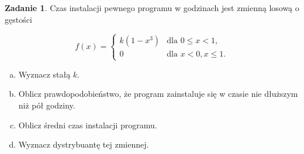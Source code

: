 \documentclass[11pt]{article}
\theoremstyle{definition}
\newtheorem{zadanie}{Zadanie}
\numberwithin{zadanie}{section}
\begin{document}
\begin{zadanie}
    Czas instalacji pewnego programu w godzinach jest zmienną losową o gęstości

    \[
        f(x) = \left\{\begin{array}{lr}
            k(1-x^3) & \text{dla } 0\leq x < 1,  \\
            0        & \text{dla } x<0, x\leq 1.
        \end{array}\right.
    \]

    \begin{enumerate}[(a)]
        \item Wyznacz stałą $k$.
        \item Oblicz prawdopodobieństwo, że program zainstaluje się w czasie nie dłuższym niż pół godziny.
        \item Oblicz średni czas instalacji programu.
        \item Wyznacz dystrybuantę tej zmiennej.
    \end{enumerate}
\end{zadanie}
\end{document}
